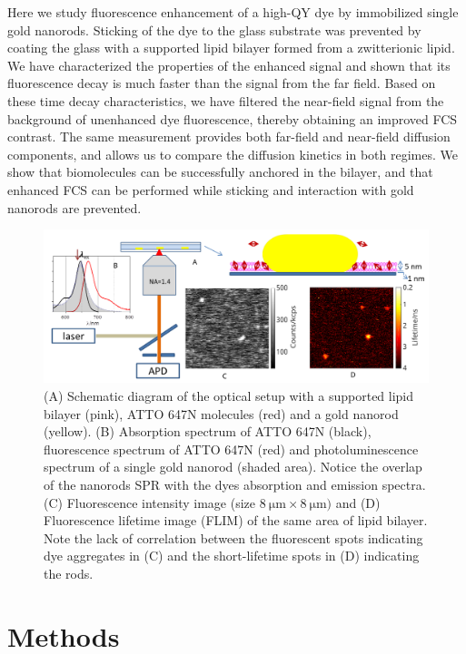 Here we study fluorescence enhancement of a high-QY dye by immobilized single gold nanorods.
Sticking of the dye to the glass substrate was prevented by coating the glass with a supported lipid bilayer formed from a zwitterionic lipid.
We have characterized the properties of the enhanced signal and shown that its fluorescence decay is much faster than the signal from the far field.
Based on these time decay characteristics, we have filtered the near-field signal from the background of unenhanced dye fluorescence, thereby obtaining an improved FCS contrast.
The same measurement provides both far-field and near-field diffusion components, and allows us to compare the diffusion kinetics in both regimes. 
We show that biomolecules can be successfully anchored in the bilayer, and that enhanced FCS can be performed while sticking and interaction with gold nanorods are prevented.
\begin{figure}
	\centering
	\includegraphics[width=\textwidth]{schematic_efcs}
	\caption{(A) Schematic diagram of the optical setup with a supported lipid bilayer (pink), ATTO 647N molecules (red) and a gold nanorod (yellow).
	(B) Absorption spectrum of ATTO 647N (black), fluorescence spectrum of ATTO 647N (red) and photoluminescence spectrum of a single gold nanorod (shaded area).
	Notice the overlap of the nanorod\textquotesingle s SPR with the dye\textquotesingle s absorption and emission spectra.
	(C) Fluorescence intensity image (size $\SI{8}{\um}\times\SI{8}{\um})$ and
	(D) Fluorescence lifetime image (FLIM) of the same area of 
	lipid bilayer.
	Note the lack of correlation between the fluorescent spots indicating dye aggregates in (C) and the short-lifetime spots in (D) indicating the rods.}
	\label{fig:schematic}
\end{figure}

\section{Methods}

